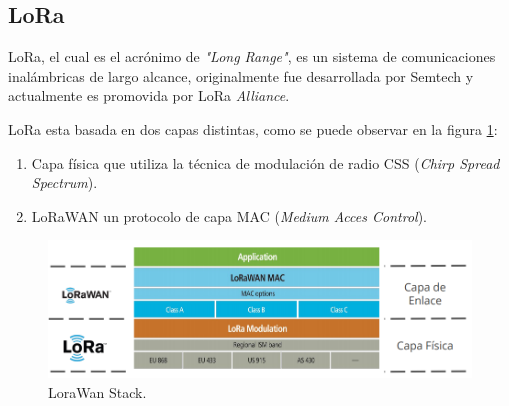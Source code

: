 \subsection{LoRa}
LoRa, el cual es el acrónimo de \textit{"Long Range"}, es un sistema de comunicaciones inalámbricas de largo alcance, originalmente fue desarrollada por Semtech y actualmente es promovida por LoRa \textit{Alliance}.

LoRa esta basada en dos capas distintas, como se puede observar en la figura \ref{fig:LoraStack}: 
\begin{enumerate}
    \item Capa física que utiliza la técnica de modulación  de radio CSS (\textit{Chirp Spread Spectrum})\cite{CSS}.
    \item LoRaWAN un protocolo de capa MAC (\textit{Medium Acces Control}).
\end{enumerate}

\begin{figure}[h]
	\centering
	\includegraphics[scale=.55]{./Figures/LoraWanClasses.PNG}
	\caption{LoraWan Stack\cite{LoRaAlliance2015}.}
	\label{fig:LoraStack}
\end{figure}


